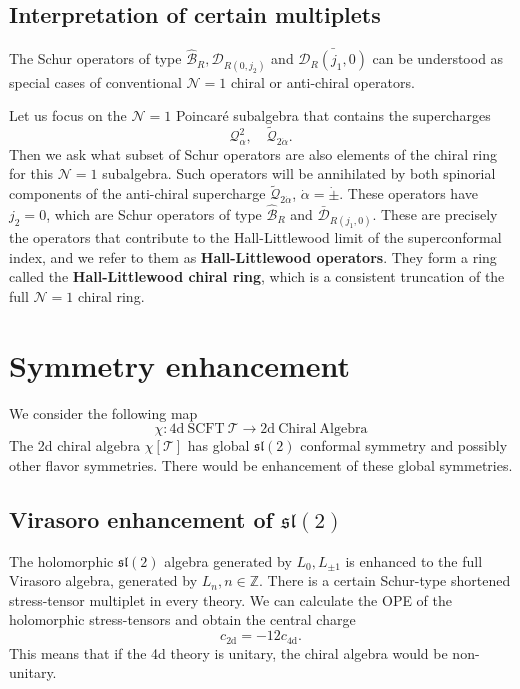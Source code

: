 \documentclass[a4paper,11pt]{article}
\begin{document}
\subsection{Interpretation of certain multiplets}
The Schur operators of type $\hat{\mathcal{B}}_R, \mathcal{D}_{R(0,j_2)}$ and $\bar{\mathcal{D}_R(j_1, 0)}$ can be understood as special cases of conventional $\mathcal{N}=1$ chiral or anti-chiral operators.

Let us focus on the $\mathcal{N}=1$ Poincar\'{e} subalgebra that contains the supercharges
\begin{equation}
    \mathcal{Q}_\alpha^2, \quad \widetilde{\mathcal{Q}}_{2 \dot{\alpha}}.
\end{equation}
Then we ask what subset of Schur operators are also elements of the chiral ring for this $\mathcal{N}=1$ subalgebra. Such operators will be annihilated by both spinorial components of the anti-chiral supercharge $\widetilde{\mathcal{Q}}_{2 \dot{\alpha}}$, $\dot{\alpha} = \dot{\pm}$. These operators have $j_2 = 0$, which are Schur operators of type $\hat{\mathcal{B}}_R$ and $\bar{\mathcal{D}}_{R(j_1,0)}$. These are precisely the operators that contribute to the Hall-Littlewood limit of the superconformal index, and we refer to them as \textbf{Hall-Littlewood operators}. They form a ring called the \textbf{Hall-Littlewood chiral ring}, which is a consistent truncation of the full $\mathcal{N}=1$ chiral ring.

\section{Symmetry enhancement}
We consider the following map
\begin{equation}
    \chi: \mathrm{4d~SCFT~}\mathcal{T} \to \mathrm{2d~Chiral~ Algebra}
\end{equation}
The 2d chiral algebra $\chi[\mathcal{T}]$ has global $\mathfrak{sl}(2)$ conformal symmetry and possibly other flavor symmetries. There would be enhancement of these global symmetries.

\subsection{Virasoro enhancement of $\mathfrak{sl}(2)$}
The holomorphic $\mathfrak{sl}(2)$ algebra generated by $L_0, L_{\pm 1}$ is enhanced to the full Virasoro algebra, generated by $L_n, n \in \mathbb{Z}$. There is a certain Schur-type shortened stress-tensor multiplet in every theory. We can calculate the OPE of the holomorphic stress-tensors and obtain the central charge
\begin{equation}
    c_{\mathrm{2d}} = -12 c_{\mathrm{4d}}.
\end{equation}
This means that if the 4d theory is unitary, the chiral algebra would be non-unitary.
\end{document}
